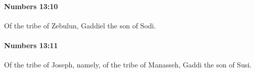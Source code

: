 		\paragraph{Numbers 13:10} %
			\label{NUMBERS-13-10}

			Of the tribe of Zebulun, Gaddiel the son of Sodi.


		\paragraph{Numbers 13:11} %
			\label{NUMBERS-13-11}

			Of the tribe of Joseph, namely, of the tribe of Manasseh, Gaddi the son of Susi.


